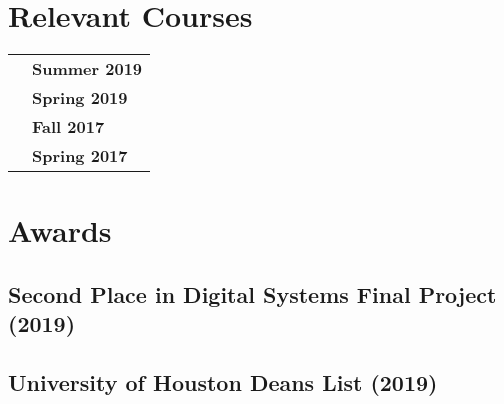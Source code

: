 \documentclass{article}
\begin{document}
\section{Relevant Courses}
\begin{flushleft}
\begin{tabular}{p{15.5cm} p{2.5cm}}

\noindent{Microprocessor Architecture}
    & \textbf{Summer 2019} \\

\noindent{Real Time Systems and Embedded Programming}
    & \textbf{Spring 2019} \\

\noindent{The Fundamentals of Operating Systems}
    & \textbf{Fall 2017} \\

\noindent{Computer Architecture and Organization}
    & \textbf{Spring 2017} \\


\end{tabular}
\end{flushleft}


\section{Awards}
\subsection{Second Place in Digital Systems Final Project (2019)}
\subsection{University of Houston Deans List (2019)}

\fi
\end{document}
